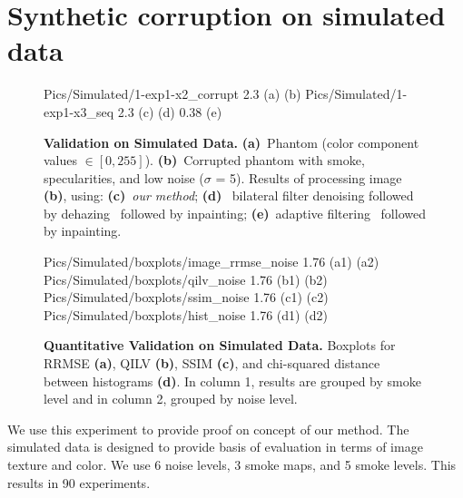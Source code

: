 \section{Synthetic corruption on simulated data}

\begin{figure}[h]
     {Pics/Simulated/1-exp1-x2_corrupt} {2.3} {(a)} {(b)}
     {Pics/Simulated/1-exp1-x3_seq} {2.3} {(c)} {(d)}
     {0.38} {(e)}
    \caption
    {
        {\bf Validation on Simulated Data. }
        {\bf (a)}~Phantom (color component values $\in [0,255]$).
        {\bf (b)}~Corrupted phantom with smoke, specularities, and low noise ($\sigma$ = 5).
        Results of processing image {\bf (b)}, using:
        {\bf (c)}~{\em our method};
        {\bf (d)}~ bilateral filter denoising followed by dehazing~\cite{he2011dark} followed by inpainting;
        {\bf (e)}~adaptive filtering~\cite{gibson2013wiener} followed by inpainting.
    }
    \label{fig:imagesPhantom1}
\end{figure}

\begin{figure}[h]
     {Pics/Simulated/boxplots/image_rrmse_noise} {1.76} {(a1)} {(a2)}
     {Pics/Simulated/boxplots/qilv_noise} {1.76} {(b1)} {(b2)}
     {Pics/Simulated/boxplots/ssim_noise} {1.76} {(c1)} {(c2)}
     {Pics/Simulated/boxplots/hist_noise} {1.76} {(d1)} {(d2)}
    \caption
    {
        {\bf Quantitative Validation on Simulated Data.}
        Boxplots for RRMSE \textbf{(a)}, QILV \textbf{(b)}, SSIM \textbf{(c)}, and chi-squared distance between histograms \textbf{(d)}.
        In column 1, results are grouped by smoke level and in column 2, grouped by noise level.
    }
    \label{fig:resultsQuantSimulated}
\end{figure}



We use this experiment to provide proof on concept of our method. The simulated data is designed to provide basis of evaluation in terms of image texture and color. We use 6 noise levels, 3 smoke maps, and 5 smoke levels. This results in 90 experiments.

